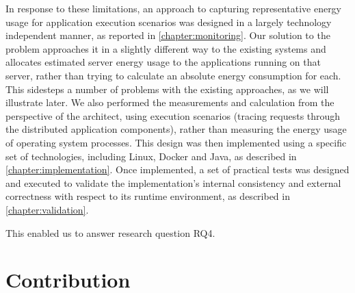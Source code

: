 In response to these limitations, an approach to capturing representative energy usage for application execution scenarios was designed in a largely technology independent manner, as reported in \cref{chapter:monitoring}.  Our solution to the problem approaches it in a slightly different way to the existing systems and allocates estimated server energy usage to the applications running on that server, rather than trying to calculate an absolute energy consumption for each.  This sidesteps a number of problems with the existing approaches, as we will illustrate later.  We also performed the measurements and calculation from the perspective of the architect, using execution scenarios (tracing requests through the distributed application components), rather than measuring the energy usage of operating system processes. This design was then implemented using a specific set of technologies, including Linux, Docker and Java, as described in \cref{chapter:implementation}.  Once implemented, a set of practical tests was designed and executed to validate the implementation's internal consistency and external correctness with respect to its runtime environment, as described in \cref{chapter:validation}.

This enabled us to answer research question RQ4.

\section{Contribution}

